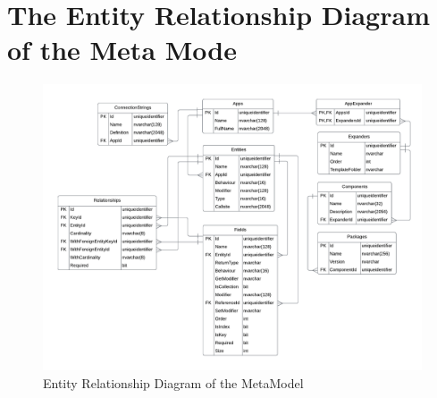 \chapter{The Entity Relationship Diagram of the Meta Mode} \label{appendix_erd}  
\begin{figure}[H]
    \centering
    \includegraphics[width=1\textwidth]{figures/erd.pdf}
    \caption[Entity Relationship Diagram of the MetaModel]{Entity Relationship Diagram of the MetaModel}
    \label{fig_erd}
\end{figure}
